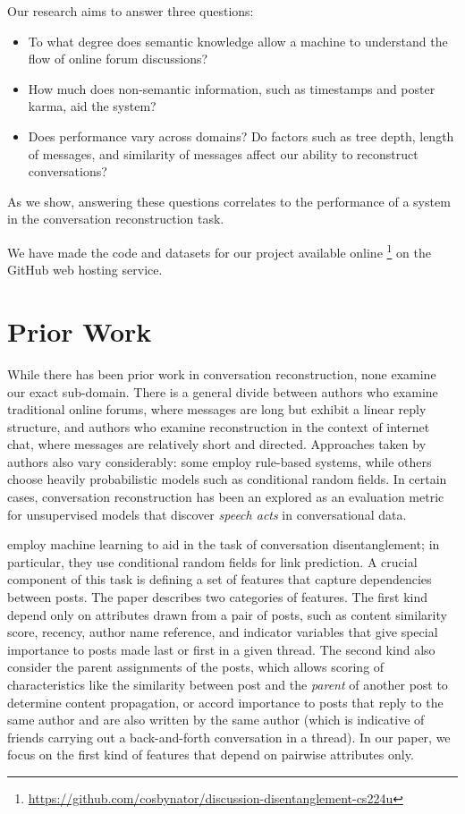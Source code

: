 \documentclass{article}
\begin{document}
Our research aims to answer three questions:
\begin{itemize}
  \item To what degree does semantic knowledge allow a machine to understand the 
    flow of online forum discussions?
  \item How much does non-semantic information, such as timestamps and poster karma,
    aid the system?
  \item Does performance vary across domains? Do factors such as tree depth,
    length of messages, and similarity of messages affect our ability to
    reconstruct conversations? 
\end{itemize}

As we show, answering these questions correlates to the performance of a system
in the conversation reconstruction task. 

We have made the code and datasets for our project available online
\footnote{\url{https://github.com/cosbynator/discussion-disentanglement-cs224u}} on the
GitHub web hosting service.

\section{Prior Work}
\label{sec:prior_work}
While there has been prior work in conversation reconstruction, none examine
our exact sub-domain. There is a general divide between authors who examine
traditional online forums, where messages are long but exhibit a linear reply
structure, and authors who examine reconstruction in the context of internet
chat, where messages are relatively short and directed. Approaches taken by
authors also vary considerably: some employ rule-based systems, while others
choose heavily probabilistic models such as conditional random fields. In
certain cases, conversation reconstruction has been an explored as an
evaluation metric for unsupervised models that discover \textit{speech acts}
in conversational data.

 employ machine
learning to aid in the task of conversation disentanglement; in particular,
they use conditional random fields for link prediction. A crucial component of
this task is defining a set of features that capture dependencies between
posts. The paper describes two categories of features. The first kind depend
only on attributes drawn from a pair of posts, such as content similarity
score, recency, author name reference, and indicator variables that give
special importance to posts made last or first in a given thread. The second
kind also consider the parent assignments of the posts, which allows scoring
of characteristics like the similarity between  post and the \emph{parent} of
another post to determine content propagation, or accord importance to posts
that reply to the same author and are also written by the same author (which
is indicative of friends carrying out a back-and-forth conversation in a
thread). In our paper, we focus on the first kind of features that depend on
pairwise attributes only.
\end{document}
